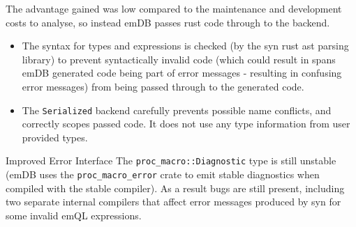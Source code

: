 The advantage gained was low compared to the maintenance and development costs to analyse, so instead emDB passes rust code through to the backend.
\begin{itemize}
    \setlength\itemsep{0em}
    \item The syntax for types and expressions is checked (by the syn rust ast parsing library) to prevent syntactically invalid code (which could result in spans emDB generated code being part of error messages - resulting in confusing error messages) from being passed through to the generated code.
    \item The \texttt{Serialized} backend carefully prevents possible name conflicts, and correctly scopes passed code. It does not use any type information from user provided types.
\end{itemize}
\begin{futurebox}{Improved Error Interface}
    The \texttt{proc_macro::Diagnostic} type is still unstable (emDB uses the \texttt{proc_macro_error} crate to emit stable diagnostics when compiled with the stable compiler).
    As a result bugs are still present, including two separate internal compilers that affect error messages produced by syn for some invalid emQL expressions.
\end{futurebox}

